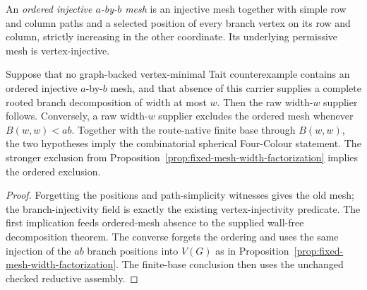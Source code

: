 \begin{proposition}
\label{prop:ordered-fixed-mesh-width-factorization}
An \emph{ordered injective \(a\)-by-\(b\) mesh} is an injective mesh together
with simple row and column paths and a selected position of every branch
vertex on its row and column, strictly increasing in the other coordinate.
Its underlying permissive mesh is vertex-injective.

Suppose that no graph-backed vertex-minimal Tait counterexample contains an
ordered injective \(a\)-by-\(b\) mesh, and that absence of this carrier
supplies a complete rooted branch decomposition of width at most \(w\).
Then the raw width-\(w\) supplier follows.
Conversely, a raw width-\(w\) supplier excludes the ordered mesh whenever
\(B(w,w)<ab\).
Together with the route-native finite base through \(B(w,w)\), the two
hypotheses imply the combinatorial spherical Four-Colour statement.
The stronger exclusion from
Proposition~\ref{prop:fixed-mesh-width-factorization} implies the ordered
exclusion.
\end{proposition}

\begin{proof}
Forgetting the positions and path-simplicity witnesses gives the old mesh;
the branch-injectivity field is exactly the existing vertex-injectivity
predicate.  The first implication feeds ordered-mesh absence to the supplied
wall-free decomposition theorem.  The converse forgets the ordering and
uses the same injection of the \(ab\) branch positions into \(V(G)\) as in
Proposition~\ref{prop:fixed-mesh-width-factorization}.  The finite-base
conclusion then uses the unchanged checked reductive assembly.
\end{proof}

